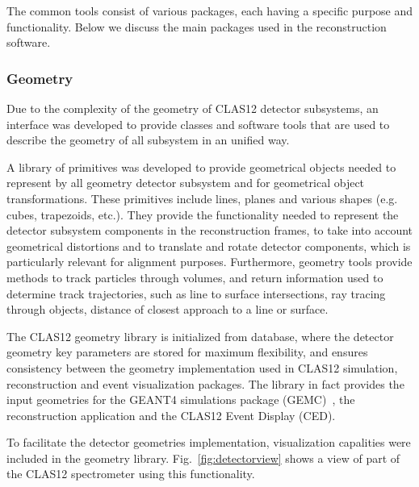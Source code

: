 The common tools consist of various packages, each having a specific purpose and functionality. Below we discuss
the main packages used in the reconstruction software.

\subsubsection{Geometry}

Due to the complexity of the geometry of CLAS12 detector subsystems, an interface was developed
to provide classes and software tools that are used to describe the geometry of all subsystem in an unified way.

A library of primitives was developed to provide geometrical objects needed to represent by all geometry detector subsystem
and for geometrical object transformations.  These primitives include lines, planes and various shapes (e.g.
cubes, trapezoids, etc.).  They provide the functionality needed
to represent the detector subsystem components in the reconstruction frames, to take into account geometrical distortions
and to translate and rotate detector components, which is particularly relevant for alignment purposes.
Furthermore, geometry tools provide methods to track particles through volumes, and return information used to determine
track trajectories, such as line to surface intersections, ray tracing through objects, distance of closest approach to a line or surface.

The CLAS12 geometry library is initialized from database, where the detector geometry key parameters are stored for maximum flexibility, and ensures consistency between the geometry implementation used in CLAS12 simulation, reconstruction and event visualization packages. The library in fact provides the input geometries for the GEANT4 simulations package (GEMC)~\cite{sim-nim}, the reconstruction application and the CLAS12 Event Display (CED).

To facilitate the detector geometries implementation, visualization capalities were included in the geometry library. Fig.~\ref{fig:detectorview} shows a view of part of the CLAS12 spectrometer using this functionality.

